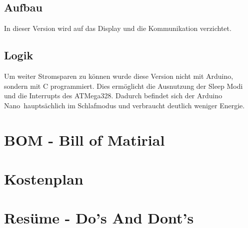 \documentclass[]{IEEEtran}
\begin{document}
	\subsection{Aufbau}
	In dieser Version wird auf das Display und die Kommunikation verzichtet.
	
	\subsection{Logik}
	Um weiter Stromsparen zu können wurde diese Version nicht mit Arduino, sondern mit C programmiert.
	Dies ermöglicht die Ausnutzung der Sleep Modi und die Interrupts des ATMega328. 
	Dadurch befindet sich der \glqq Arduino Nano\grqq \ hauptsächlich im Schlafmodus und verbraucht deutlich weniger Energie. 
	
	\section{BOM - Bill of Matirial}
	
	\section{Kostenplan}
	
	\section{Resüme - Do's And Dont's}	
\end{document}
